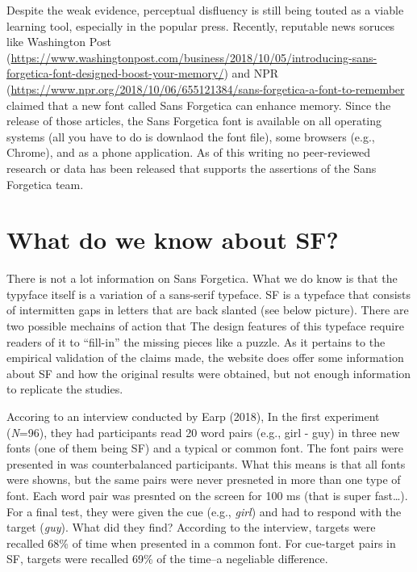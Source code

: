 \documentclass[pdf]{apa6}
\begin{document}
Despite the weak evidence, perceptual disfluency is still being touted as a viable learning tool, especially in the popular press. Recently, reputable news soruces like Washington Post (\url{https://www.washingtonpost.com/business/2018/10/05/introducing-sans-forgetica-font-designed-boost-your-memory/}) and NPR (\url{https://www.npr.org/2018/10/06/655121384/sans-forgetica-a-font-to-remember} claimed that a new font called Sans Forgetica can enhance memory. Since the release of those articles, the Sans Forgetica font is available on all operating systems (all you have to do is downlaod the font file), some browsers (e.g., Chrome), and as a phone application. As of this writing no peer-reviewed research or data has been released that supports the assertions of the Sans Forgetica team.

\hypertarget{what-do-we-know-about-sf}{%
\section{What do we know about SF?}\label{what-do-we-know-about-sf}}

There is not a lot information on Sans Forgetica. What we do know is that the typyface itself is a variation of a sans-serif typeface. SF is a typeface that consists of intermitten gaps in letters that are back slanted (see below picture). There are two possible mechains of action that The design features of this typeface require readers of it to \enquote{fill-in} the missing pieces like a puzzle. As it pertains to the empirical validation of the claims made, the website does offer some information about SF and how the original results were obtained, but not enough information to replicate the studies.

Accoring to an interview conducted by Earp (2018), In the first experiment (\emph{N}=96), they had participants read 20 word pairs (e.g., girl - guy) in three new fonts (one of them being SF) and a typical or common font. The font pairs were presented in was counterbalanced participants. What this means is that all fonts were showns, but the same pairs were never presneted in more than one type of font. Each word pair was presnted on the screen for 100 ms (that is super fast\ldots{}). For a final test, they were given the cue (e.g., \emph{girl}) and had to respond with the target (\emph{guy}). What did they find? According to the interview, targets were recalled 68\% of time when presented in a common font. For cue-target pairs in SF, targets were recalled 69\% of the time--a negeliable difference.
\end{document}
